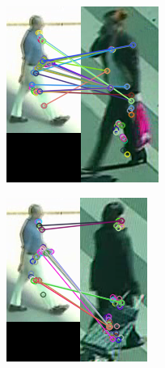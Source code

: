 \begin{figure}[!h]
	\centering
	\begin{subfigure}[!h]{0.24\textwidth}
		\includegraphics[width=\linewidth]{images/recognition/kpSample_aLotofMatches2}
	\end{subfigure}
	\begin{subfigure}[!h]{0.24\textwidth}
		\includegraphics[width=\linewidth]{images/recognition/kpSample_object2}

\end{subfigure}
\end{figure}
